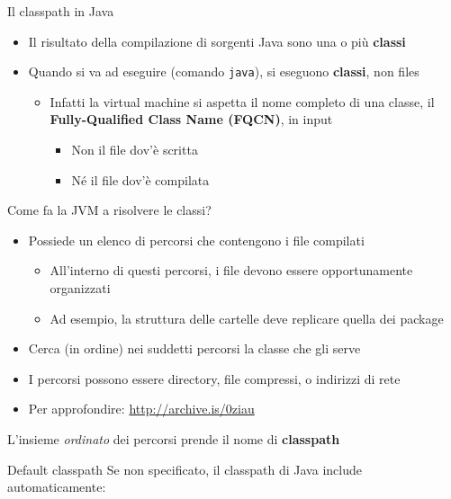 \documentclass[xcolor=dvipsnames,presentation]{beamer}
\begin{document}
\begin{frame}[allowframebreaks]{Il classpath in Java}
    \begin{itemize}
        \item Il risultato della compilazione di sorgenti Java sono una o più \textbf{classi}
        \item Quando si va ad eseguire (comando \texttt{java}), si eseguono \textbf{classi}, non files
        \begin{itemize}
            \item Infatti la virtual machine si aspetta il nome completo di una classe, il \textbf{Fully-Qualified Class Name (FQCN)}, in input
            \begin{itemize}
                \item Non il file dov'è scritta
                \item Né il file dov'è compilata
            \end{itemize}
        \end{itemize}
    \end{itemize}
    \begin{block}{Come fa la JVM a risolvere le classi?}
        \begin{itemize}
            \item Possiede un elenco di percorsi che contengono i file compilati
            \begin{itemize}
                \item All'interno di questi percorsi, i file devono essere opportunamente organizzati
                \item Ad esempio, la struttura delle cartelle deve replicare quella dei package
            \end{itemize}
            \item Cerca (in ordine) nei suddetti percorsi la classe che gli serve
            \item I percorsi possono essere directory, file compressi, o indirizzi di rete
            \item Per approfondire: \url{http://archive.is/0ziau}
        \end{itemize}
    \end{block}
    \begin{center}
        L'insieme \emph{ordinato} dei percorsi prende il nome di \textbf{classpath}
    \end{center}
    \begin{block}{Default classpath}
        Se non specificato, il classpath di Java include automaticamente:

\end{block}
\end{frame}
\end{document}
